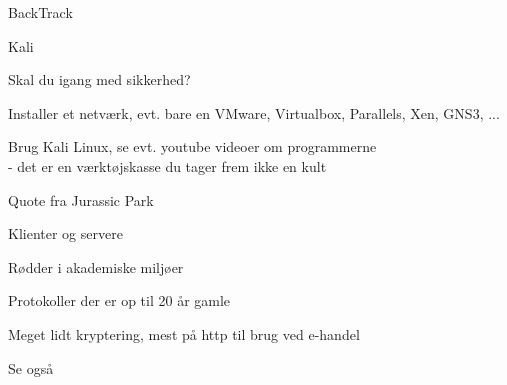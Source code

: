 \documentclass[20pt,landscape,a4paper,footrule]{foils}
\begin{document}


\begin{list1}
\item BackTrack 
\item  Kali 
\end{list1}




\begin{list1}
\item Skal du igang med sikkerhed?
\item Installer et netværk, evt. bare en VMware, Virtualbox, Parallels, Xen, GNS3, ...
\item Brug Kali Linux, se evt. youtube videoer om programmerne\\
- det er en værktøjskasse du tager frem ikke en kult \smiley
\end{list1}

Quote fra Jurassic Park



\begin{list1}
\item Klienter og servere
\item Rødder i akademiske miljøer
\item Protokoller der er op til 20 år gamle
\item Meget lidt kryptering, mest på http til brug ved e-handel
\end{list1}






Se også 

\end{document}
